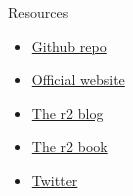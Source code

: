 \documentclass{beamer}
\begin{document}
\begin{frame}{Resources}
	\begin{itemize}
		\item \href{https://github.com/radare/radare2}{Github repo}
		\item \href{http://rada.re}{Official website}
		\item \href{http://radare.today}{The r2 blog}
		\item \href{http://maijin.github.io/radare2book/}{The r2 book}
		\item \href{https://twitter.com/radareorg}{Twitter}
	\end{itemize}
\end{frame}
\end{document}
